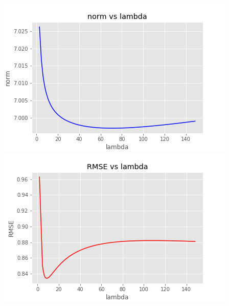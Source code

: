 \documentclass[12pt,letterpaper]{hmcpset}
\begin{document}
\begin{solution}
\begin{enumerate}[(a)]
	\includegraphics[scale = 0.54]{Images/norm_vs_lambda.png}
	\includegraphics[scale = 0.54]{Images/RMSE_vs_lambda.png}
\end{enumerate}
\end{solution}
\newpage
\end{document}
